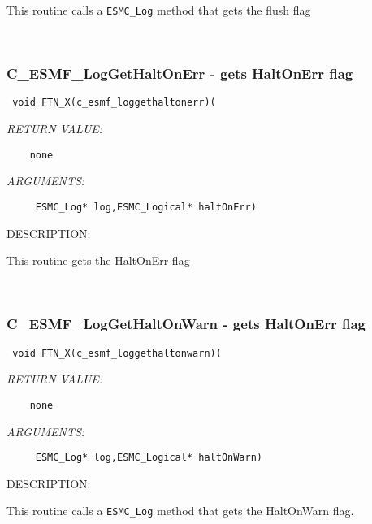    This routine calls a {\tt ESMC\_Log} method that gets the flush flag
   
 
\mbox{}\hrulefill\ 
 
\subsubsection [C\_ESMF\_LogGetHaltOnErr] {C\_ESMF\_LogGetHaltOnErr - gets HaltOnErr flag }


  
\begin{verbatim} void FTN_X(c_esmf_loggethaltonerr)(\end{verbatim}{\em RETURN VALUE:}
\begin{verbatim}    none\end{verbatim}{\em ARGUMENTS:}
\begin{verbatim}     ESMC_Log* log,ESMC_Logical* haltOnErr)\end{verbatim}
{\sf DESCRIPTION:\\ }


   This routine gets the HaltOnErr flag
   
 
\mbox{}\hrulefill\ 
 
\subsubsection [C\_ESMF\_LogGetHaltOnWarn] {C\_ESMF\_LogGetHaltOnWarn - gets HaltOnErr flag}


  
\begin{verbatim} void FTN_X(c_esmf_loggethaltonwarn)(\end{verbatim}{\em RETURN VALUE:}
\begin{verbatim}    none\end{verbatim}{\em ARGUMENTS:}
\begin{verbatim}     ESMC_Log* log,ESMC_Logical* haltOnWarn)\end{verbatim}
{\sf DESCRIPTION:\\ }


    This routine calls a {\tt ESMC\_Log} method that gets the HaltOnWarn flag.
  
